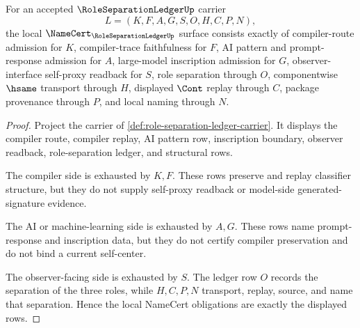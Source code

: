 \begin{theorem}
\label{thm:role-separation-ledger-namecert-obligations}
For an accepted $\RoleSeparationLedgerUp$ carrier
$$
L=(K,F,A,G,S,O,H,C,P,N),
$$
the local $\NameCert_{\RoleSeparationLedgerUp}$ surface consists exactly of compiler-route admission for $K$, compiler-trace faithfulness for $F$, AI pattern and prompt-response admission for $A$, large-model inscription admission for $G$, observer-interface self-proxy readback for $S$, role separation through $O$, componentwise $\hsame$ transport through $H$, displayed $\Cont$ replay through $C$, package provenance through $P$, and local naming through $N$.
\end{theorem}
\begin{proof}
Project the carrier of \autoref{def:role-separation-ledger-carrier}. It displays the compiler route, compiler replay, AI pattern row, inscription boundary, observer readback, role-separation ledger, and structural rows.

The compiler side is exhausted by $K,F$. These rows preserve and replay classifier structure, but they do not supply self-proxy readback or model-side generated-signature evidence.

The AI or machine-learning side is exhausted by $A,G$. These rows name prompt-response and inscription data, but they do not certify compiler preservation and do not bind a current self-center.

The observer-facing side is exhausted by $S$. The ledger row $O$ records the separation of the three roles, while $H,C,P,N$ transport, replay, source, and name that separation. Hence the local NameCert obligations are exactly the displayed rows.
\end{proof}


